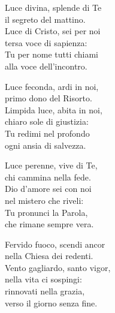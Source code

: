 
\strofa Luce divina, splende di Te\\
il segreto del mattino.\\
Luce di Cristo, sei per noi\\
tersa voce di sapienza:\\
Tu per nome tutti chiami\\
alla voce dell'incontro.

\spazio

\strofa Luce feconda, ardi in noi,\\
primo dono del Risorto.\\
Limpida luce, abita in noi,\\
chiaro sole di giustizia:\\
Tu redimi nel profondo\\
ogni ansia di salvezza.

\spazio

\strofa Luce perenne, vive di Te,\\
chi cammina nella fede.\\
Dio d'amore sei con noi\\
nel mistero che riveli:\\
Tu pronunci la Parola,\\
che rimane sempre vera.

\spazio

\strofa Fervido fuoco, scendi ancor\\
nella Chiesa dei redenti.\\
Vento gagliardo, santo vigor,\\
nella vita ci sospingi:\\
rinnovati nella grazia,\\
verso il giorno senza fine.
